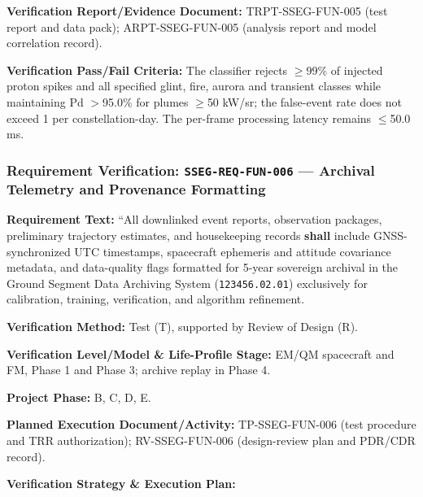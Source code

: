 \par\textbf{Verification Report/Evidence Document:} TRPT-SSEG-FUN-005 (test report and data pack); ARPT-SSEG-FUN-005 (analysis report and model correlation record).
\par\textbf{Verification Pass/Fail Criteria:} The classifier rejects $\ge$99\% of injected proton spikes and all specified glint, fire, aurora and transient classes while maintaining Pd $>$95.0\% for plumes $\ge$50 kW/sr; the false-event rate does not exceed 1 per constellation-day. The per-frame processing latency remains $\le$50.0 ms.
\par\medskip
\subsubsection{Requirement Verification: \texttt{SSEG-REQ-FUN-006} --- Archival Telemetry and Provenance Formatting}
\label{ver:SSEG-REQ-FUN-006}
\textbf{Requirement Text:} ``All downlinked  event reports,  observation packages, preliminary trajectory estimates, and housekeeping records \textbf{shall} include GNSS-synchronized UTC timestamps, spacecraft ephemeris and attitude covariance metadata, and data-quality flags formatted for 5-year sovereign archival in the Ground Segment Data Archiving System (\texttt{123456.02.01}) exclusively for calibration, training, verification, and algorithm refinement.
\par\textbf{Verification Method:} Test (T), supported by Review of Design (R).
\par\textbf{Verification Level/Model \& Life-Profile Stage:} EM/QM spacecraft and FM, Phase 1 and Phase 3; archive replay in Phase 4.
\par\textbf{Project Phase:} B, C, D, E.
\par\textbf{Planned Execution Document/Activity:} TP-SSEG-FUN-006 (test procedure and TRR authorization); RV-SSEG-FUN-006 (design-review plan and PDR/CDR record).
\par\textbf{Verification Strategy \& Execution Plan:}
